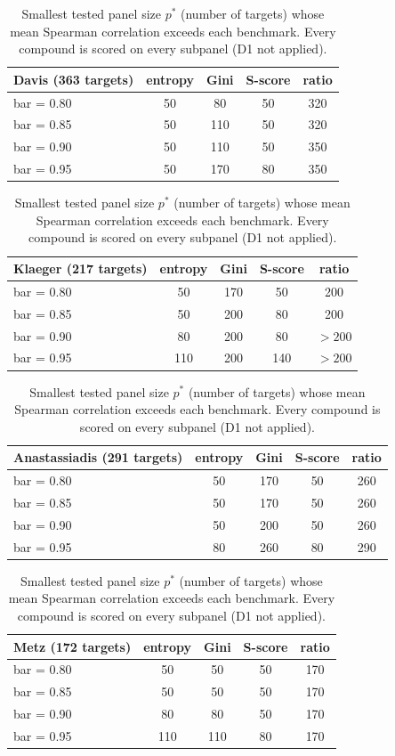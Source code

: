 \documentclass[11pt]{article}
\begin{document}
\begin{table}[h]
\centering
\caption{Smallest tested panel size $p^*$ (number of targets) whose mean
Spearman correlation exceeds each benchmark. Every compound is scored on
every subpanel (D1 not applied).}
\begin{tabular}{lcccc}
\toprule
Davis (363 targets) & entropy & Gini & S-score & ratio \\
\midrule
bar = 0.80 & 50 & 80 & 50 & 320 \\
bar = 0.85 & 50 & 110 & 50 & 320 \\
bar = 0.90 & 50 & 110 & 50 & 350 \\
bar = 0.95 & 50 & 170 & 80 & 350 \\
\bottomrule
\end{tabular}

\vspace{1em}
\begin{tabular}{lcccc}
\toprule
Klaeger (217 targets) & entropy & Gini & S-score & ratio \\
\midrule
bar = 0.80 & 50 & 170 & 50 & 200 \\
bar = 0.85 & 50 & 200 & 80 & 200 \\
bar = 0.90 & 80 & 200 & 80 & $>200$ \\
bar = 0.95 & 110 & 200 & 140 & $>200$ \\
\bottomrule
\end{tabular}

\vspace{1em}
\begin{tabular}{lcccc}
\toprule
Anastassiadis (291 targets) & entropy & Gini & S-score & ratio \\
\midrule
bar = 0.80 & 50 & 170 & 50 & 260 \\
bar = 0.85 & 50 & 170 & 50 & 260 \\
bar = 0.90 & 50 & 200 & 50 & 260 \\
bar = 0.95 & 80 & 260 & 80 & 290 \\
\bottomrule
\end{tabular}

\vspace{1em}
\begin{tabular}{lcccc}
\toprule
Metz (172 targets) & entropy & Gini & S-score & ratio \\
\midrule
bar = 0.80 & 50 & 50 & 50 & 170 \\
bar = 0.85 & 50 & 50 & 50 & 170 \\
bar = 0.90 & 80 & 80 & 50 & 170 \\
bar = 0.95 & 110 & 110 & 80 & 170 \\
\bottomrule
\end{tabular}
\end{table}
\end{document}
